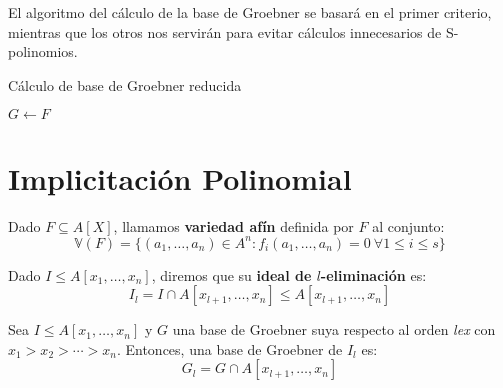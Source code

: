 El algoritmo del cálculo de la base de Groebner se basará en el primer criterio, mientras que los otros nos servirán para evitar cálculos innecesarios de S-polinomios.

\begin{algorithm}[hbt!]
  \caption{Cálculo de base de Groebner reducida}\label{alg:div}

  $G\gets F$\;


\end{algorithm}

\section{Implicitación Polinomial}

\begin{definicion}Dado $F \subseteq A[X]$, llamamos \textbf{variedad afín} definida por $F$ al conjunto:
  \begin{equation*}
    \mathbb{V}(F) = \{(a_1,\dots, a_n)\in A^n : f_i(a_1,\dots, a_n)=0 \ \forall 1\le i \le s\}
  \end{equation*}
\end{definicion}

\begin{definicion}
  Dado $I\le A[x_1,\dots,x_n]$, diremos que su \textbf{ideal de $l$-eliminación} es:
  \begin{equation*}
    I_l = I \cap A[x_{l+1}, \dots, x_n] \le A[x_{l+1}, \dots, x_n]
  \end{equation*}
\end{definicion}

\begin{teorema}[Eliminación]
  Sea $I\le A[x_1,\dots,x_n]$ y $G$ una base de Groebner suya respecto al orden \textit{lex} con $x_1 > x_2 > \cdots > x_n$. Entonces, una base de Groebner de $I_l$ es:
  \begin{equation*}
    G_l = G\cap A[x_{l+1},\dots, x_n]
  \end{equation*}
\end{teorema}

